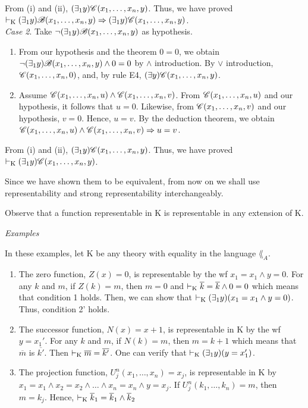 From (i) and (ii), $(\exists_1 y) \mathscr{C}(x_1, \dots, x_n, y)$. Thus, we have proved $\vdash_\text{K} (\exists_1 y) \mathscr{B}(x_1, \dots, x_n, y) \Rightarrow (\exists_1 y) \mathscr{C}(x_1, \dots, x_n, y)$. \\

\textit{Case 2}. Take $\lnot (\exists_1 y) \mathscr{B}(x_1, \dots, x_n, y)$ as hypothesis.

\begin{enumerate} [label = (\roman*)]
    \item From our hypothesis and the theorem $0=0$, we obtain $\lnot (\exists_1 y) \mathscr{B}(x_1, \dots, x_n, y) \land 0=0$ by $\land$ introduction. By $\lor$ introduction, $\mathscr{C}(x_1, \dots, x_n, 0)$, and, by rule E4, $(\exists y) \mathscr{C}(x_1, \dots, x_n, y)$.
    \item Assume $\mathscr{C}(x_1, \dots, x_n, u) \land \mathscr{C}(x_1, \dots, x_n, v)$. From $\mathscr{C}(x_1, \dots, x_n, u)$ and our hypothesis, it follows that $u=0$. Likewise, from $\mathscr{C}(x_1, \dots, x_n, v)$ and our hypothesis, $v=0$. Hence, $u=v$. By the deduction theorem, we obtain $\mathscr{C}(x_1, \dots, x_n, u) \land \mathscr{C}(x_1, \dots, x_n, v) \Rightarrow u=v$.
\end{enumerate}

From (i) and (ii), $(\exists_1 y) \mathscr{C}(x_1, \dots, x_n, y)$. Thus, we have proved $\vdash_\text{K} (\exists_1 y) \mathscr{C}(x_1, \dots, x_n, y)$.

Since we have shown them to be equivalent, from now on we shall use representability and strong representability interchangeably.

Observe that a function representable in K is representable in any extension of K.

\textit{Examples}

In these examples, let K be any theory with equality in the language $\lang_A$.

\begin{enumerate}
    \item The zero function, $Z(x) = 0$, is representable by the wf $x_1 = x_1 \land y=0$. For any $k$ and $m$, if $Z(k)=m$, then $m=0$ and $\vdash_\text{K} \overline{k} = \overline{k} \land 0 = 0$ which means that condition 1 holds. Then, we can show that $\vdash_\text{K} (\exists_1 y)(x_1=x_1 \land y = 0)$. Thus, condition 2' holds.
    \item The successor function, $N(x)=x+1$, is representable in K by the wf $y=x_1'$. For any $k$ and $m$, if $N(k)=m$, then $m = k+1$ which means that $\overline{m}$ is $\overline{k'}$. Then $\vdash_\text{K} \overline{m} = \overline{k'}$. One can verify that $\vdash_\text{K} (\exists_1 y) (y=x_1')$.
    \item The projection function, $U_j^n(x_1, \dots, x_n) = x_j$, is representable in K by $x_1=x_1 \land x_2=x_2 \land \dots \land x_n=x_n \land y = x_j$. If $U_j^n(k_1, \dots, k_n) = m$, then $m=k_j$. Hence, $\vdash_\text{K} \overline{k}_1 = \overline{k}_1 \land \overline{k}_2$ 
\end{enumerate}
